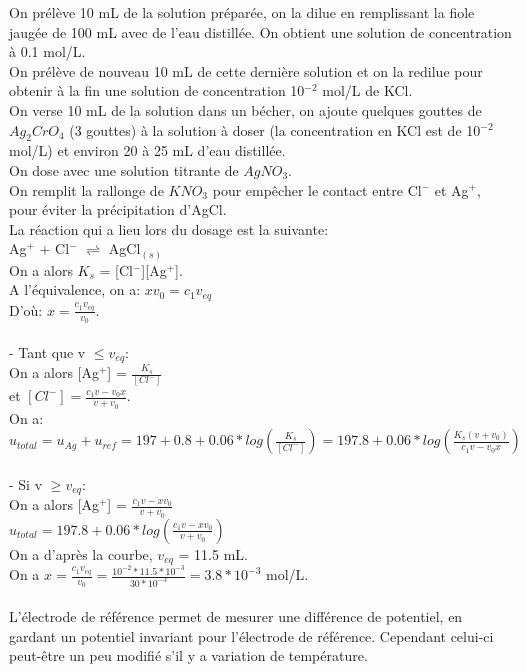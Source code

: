 \documentclass{scrartcl}
\begin{document}
			On prélève 10 mL de la solution préparée, on la dilue en remplissant la fiole jaugée de 100 mL avec de l'eau distillée. On obtient une solution de concentration à 0.1 mol/L.\\
			On prélève de nouveau 10 mL de cette dernière solution et on la redilue pour obtenir à la fin une solution de concentration 10$^{-2}$ mol/L de KCl.\\
			On verse 10 mL de la solution dans un bécher, on ajoute quelques gouttes de $Ag_2CrO_4$ (3 gouttes) à la solution à doser (la concentration en KCl est de 10$^{-2}$ mol/L) et environ 20 à 25 mL d'eau distillée.\\
			On dose avec une solution titrante de $AgNO_3$.\\
			On remplit la rallonge de $KNO_3$ pour empêcher le contact entre Cl$^-$ et Ag$^+$, pour éviter la précipitation d'AgCl.\\
			La réaction qui a lieu lors du dosage est la suivante:\\
			Ag$^+$ + Cl$^-$ $\rightleftharpoons$ AgCl$_{(s)}$\\
			On a alors $K_s$ = [Cl$^-$][Ag$^+$].\\
			A l'équivalence, on a: $x v_0 = c_1 v_{eq}$\\
			D'où: $x = \frac{c_1 v_{eq}}{v_0}$.\\\\
			- Tant que v $\leqslant v_{eq}$:\\
			On a alors [Ag$^+$] = $\frac{K_s}{[Cl^-]}$\\
			et $[Cl^-] = \frac{c_1 v - v_0 x}{v + v_0}$.\\
			On a: $u_{total} = u_{Ag} + u_{ref} = 197 + 0.8 + 0.06 * log\left(\frac{K_s}{[Cl^-]}\right) = 197.8 + 0.06 * log\left(\frac{K_s(v + v_0)}{c_1 v - v_0 x}\right)$\\\\
			- Si v $\geqslant v_{eq}$:\\
			On a alors [Ag$^+$] = $\frac{c_1 v - x v_0}{v + v_0}$\\
			$u_{total} = 197.8 + 0.06 * log\left(\frac{c_1 v - x v_0}{v + v_0}\right)$\\
			On a d'après la courbe, $v_{eq}$ = 11.5 mL.\\
			On a $x = \frac{c_1 v_{eq}}{v_0} = \frac{10^{-2} * 11.5 * 10^{-3}}{30 * 10^{-3}} = 3.8 * 10^{-3}$ mol/L.\\\\
			
			L'électrode de référence permet de mesurer une différence de potentiel, en gardant un potentiel invariant pour l'électrode de référence. Cependant celui-ci peut-être un peu modifié s'il y a variation de température.\\
			
\end{document}
